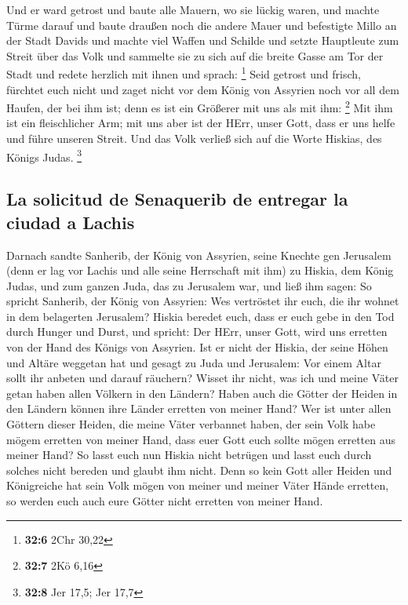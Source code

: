  Und er ward getrost und baute alle Mauern, wo sie lückig
waren, und machte Türme darauf und baute draußen noch die andere Mauer
und befestigte Millo an der Stadt Davids und machte viel Waffen und
Schilde  und setzte Hauptleute zum Streit über das Volk
und sammelte sie zu sich auf die breite Gasse am Tor der Stadt und
redete herzlich mit ihnen und sprach: \footnote{\textbf{32:6} 2Chr 30,22}
 Seid getrost und frisch, fürchtet euch nicht und zaget
nicht vor dem König von Assyrien noch vor all dem Haufen, der bei ihm
ist; denn es ist ein Größerer mit uns als mit ihm: \footnote{\textbf{32:7}
  2Kö 6,16}  Mit ihm ist ein fleischlicher Arm; mit uns
aber ist der HErr, unser Gott, dass er uns helfe und führe unseren
Streit. Und das Volk verließ sich auf die Worte Hiskias, des Königs
Judas. \footnote{\textbf{32:8} Jer 17,5; Jer 17,7}

\hypertarget{la-solicitud-de-senaquerib-de-entregar-la-ciudad-a-lachis}{%
\subsection{La solicitud de Senaquerib de entregar la ciudad a
Lachis}\label{la-solicitud-de-senaquerib-de-entregar-la-ciudad-a-lachis}}

 Darnach sandte Sanherib, der König von Assyrien, seine
Knechte gen Jerusalem (denn er lag vor Lachis und alle seine Herrschaft
mit ihm) zu Hiskia, dem König Judas, und zum ganzen Juda, das zu
Jerusalem war, und ließ ihm sagen:  So spricht Sanherib,
der König von Assyrien: Wes vertröstet ihr euch, die ihr wohnet in dem
belagerten Jerusalem?  Hiskia beredet euch, dass er euch
gebe in den Tod durch Hunger und Durst, und spricht: Der HErr, unser
Gott, wird uns erretten von der Hand des Königs von Assyrien.
 Ist er nicht der Hiskia, der seine Höhen und Altäre
weggetan hat und gesagt zu Juda und Jerusalem: Vor einem Altar sollt ihr
anbeten und darauf räuchern?  Wisset ihr nicht, was ich
und meine Väter getan haben allen Völkern in den Ländern? Haben auch die
Götter der Heiden in den Ländern können ihre Länder erretten von meiner
Hand?  Wer ist unter allen Göttern dieser Heiden, die
meine Väter verbannet haben, der sein Volk habe mögem erretten von
meiner Hand, dass euer Gott euch sollte mögen erretten aus meiner Hand?
 So lasst euch nun Hiskia nicht betrügen und lasst euch
durch solches nicht bereden und glaubt ihm nicht. Denn so kein Gott
aller Heiden und Königreiche hat sein Volk mögen von meiner und meiner
Väter Hände erretten, so werden euch auch eure Götter nicht erretten von
meiner Hand.

